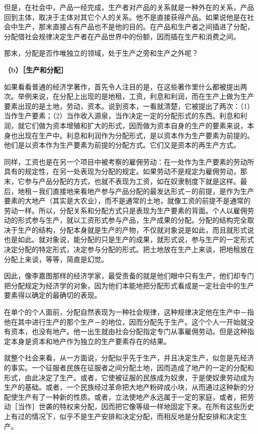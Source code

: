 \documentclass[a4paper,twoside,12pt]{ctexart}
\begin{document}
但是，在社会中，产品一经完成，生产者对产品的关系就是一种外在的关系，产品回到主体，取决于主体对其它个人的关系。他不是直接获得产品。如果说他是在社会中生产，那末直接占有产品也不是他的目的。在产品和生产者之间插进了分配，分配借社会规律决定生产者在产品世界中的份额，因而插在生产和消费之间。

那末，分配是否作唯独立的领域，处于生产之旁和生产之外呢？

\textbf{（b）［生产和分配］}

如果看看普通的经济学著作，首先令人注目的是，在这些著作里什么都被提出两次。举例来说，在分配上出现的是地租，工资，利息和利润，而在生产上做为生产要素出现的是土地，劳动，资本。说到资本，一看就清楚，它被提出了两次：（1）当作生产要素；（2）当作收入源泉，当作决定一定的分配形式的东西。利息和利润，就它们做为资本增殖和扩大的形式，因而做为资本自身的生产的要素来说，本身也出现在生产中。利息和利润作为分配形式，是以资本作为生产要素为前提的。他们是以资本作为生产要素为前提的分配方式。它们又是资本的再生产方式。

同样，工资也是在另一个项目中被考察的雇佣劳动：在一处作为生产要素的劳动所具有的规定性，在另一处表现为分配的规定。如果劳动不是规定为雇佣劳动，那末，它参与产品分配的方式，也就不表现为工资，如在奴隶制度下就是这样。最后，地租－我们直接地来看地产参与产品分配的最发达形式－的前提，是作为生产要素的大地产（其实是大农业），而不是通常的土地，就像工资的前提不是通常的劳动一样。所以，分配关系和分配方式只是表现为生产要素的背面。个人以雇佣劳动的形式参与生产，就以工资形式参与产品，生产成果的分配。分配的结构完全取决于生产的结构，分配本身就是生产的产物，不仅就对象说是如此，而且就形式说也是如此。就对象说，能分配的只是生产的成果，就形式说，参与生产的一定形式决定分配的特定形式，决定参与分配的形式。把土地放在生产上来谈，把地租放在分配上来谈，等等，简直是幻觉。

因此，像李嘉图那样的经济学家，最受责备的就是他们眼中只有生产，他们却专门把分配规定为经济学的对象，因为他们本能地把分配形式看成是一定社会中的生产要素得以确定的最确切的表现。

在单个的个人面前，分配自然表现为一种社会规律，这种规律决定他在生产中－指他在其中进行生产的那个生产－的地位，因而分配先于生产。这个个人一开始就没有资本，也没有地产。他一出生就由社会分配指定专门从事雇佣劳动。但是这种指定本身是资本和地产作为独立的生产要素存在的结果。

就整个社会来看，从一方面说，分配似乎先于生产，并且决定生产，似忽是先经济的事实。一个征服者民族在征服者之间分配土地，因而造成了地产的一定的分配和形式，由此决定了生产。或者，它使被征服的民族成为奴隶，于是使奴隶劳动成为生产的基础。或者，一个民族经过革命把大地产粉碎成小块，从而通过这种新的分配使生产有了一种新的性质。或者，立法使地产永远属于一定的家庭，或者，把劳动［当作］世袭的特权来分配，因而把它像等级一样地固定下来。在所有这些历史上有过的情况下，似乎不是生产安排和决定分配，而相反地是分配安排和决定生产。
\end{document}
